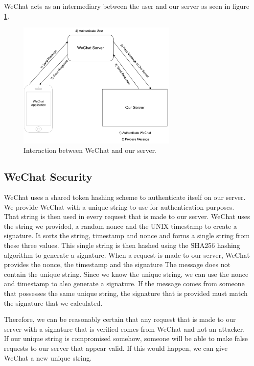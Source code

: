 WeChat acts as an intermediary between the user and our server as seen in figure \ref{fig:wechat_interaction}. 

\begin{figure}
  \centering
   \caption{Interaction between WeChat and our server.} 
    \includegraphics[width=0.7\textwidth]{figs/Wechat_interaction.pdf}
  
   \label{fig:wechat_interaction}
\end{figure}

\subsection{WeChat Security}
\label{sct:wechat_security}

WeChat uses a shared token hashing scheme to authenticate itself on our server. We provide WeChat with a unique string to use for authentication purposes. That string is then used in every request that is made to our server. WeChat uses the string we provided, a random nonce and the UNIX timestamp to create a signature. It sorts the string, timestamp and nonce and forms a single string from these three values. This single string is then hashed using the SHA256 hashing algorithm to generate a signature. When a request is made to our server, WeChat provides the nonce, the timestamp and the signature The message does not contain the unique string. Since we know the unique string, we can use the nonce and timestamp to also generate a signature. If the message comes from someone that possesses the same unique string, the signature that is provided must match the signature that we calculated.

Therefore, we can be reasonably certain that any request that is made to our server with a signature that is verified comes from WeChat and not an attacker. If our unique string is compromised somehow, someone will be able to make false requests to our server that appear valid. If this would happen, we can give WeChat a new unique string. 

